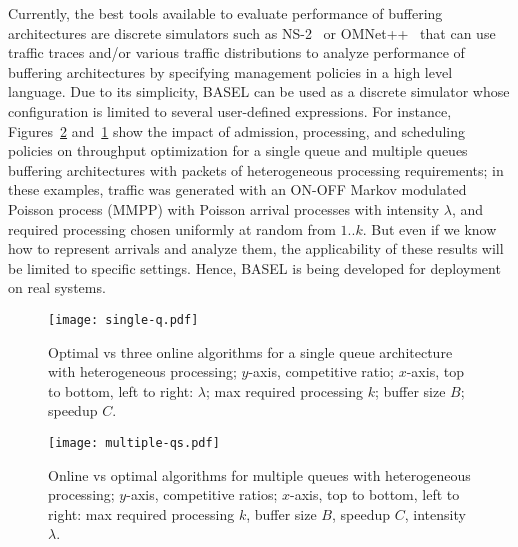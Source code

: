 \documentclass{article}
\def\legendsize{\scriptsize}
\newcommand{\barch}{BASEL}
\begin{document}
Currently, the best tools available to evaluate performance of buffering architectures are discrete simulators such as 
NS-2~\cite{ns2} or OMNet++~\cite{omnnet} that can use traffic traces and/or various traffic distributions to 
analyze performance of buffering architectures by specifying management policies in a high level language. 
Due to its simplicity, \barch{} can be used as a discrete simulator whose configuration is limited to several
user-defined expressions. 
For instance,
Figures~\ref{fig:sim-queues} and~\ref{fig:sim-queue} show the impact
of admission, processing, and scheduling policies on throughput
optimization for a single queue and multiple queues buffering
architectures with packets of heterogeneous processing requirements;
in these examples, traffic was generated with an ON-OFF
Markov modulated Poisson process (MMPP) with Poisson arrival processes
with intensity $\lambda$, and required processing chosen uniformly at
random from $1..k$. But even if we know how to represent arrivals and
analyze them, the applicability of these results will be limited to
specific settings. Hence, \barch{} is being developed for deployment on real
systems.

\begin{figure}
\centerline{
\texttt{[image: single-q.pdf]}
}
\vspace{-10pt}
\caption{Optimal vs three online algorithms for a single queue architecture with heterogeneous processing;
$y$-axis, competitive ratio; $x$-axis, top to bottom, left to right: $\lambda$; max required processing $k$; 
buffer size $B$; speedup $C$.}
\label{fig:sim-queue}
\end{figure}





\def\legendsize{\scriptsize}

\begin{figure}
\centerline{
\texttt{[image: multiple-qs.pdf]}
}
\vspace{-10pt}
\caption{Online vs optimal algorithms for multiple que\-ues with heterogeneous processing;
$y$-axis, competitive ratios; $x$-axis, top to bottom, left to right: max required processing $k$, buffer size $B$, speedup $C$, intensity $\lambda$.}
\label{fig:sim-queues}
\end{figure}
\end{document}
